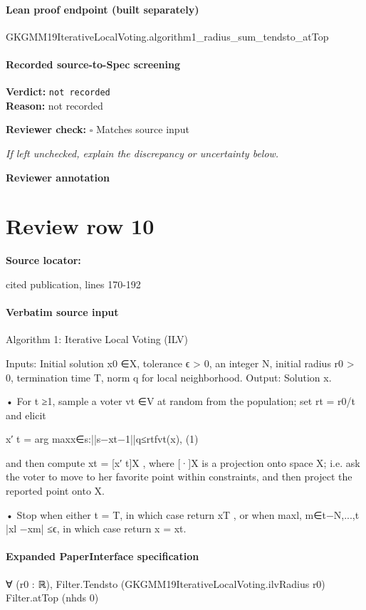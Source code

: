 \documentclass[10pt]{article}
\newcommand{\reviewerbox}{%
  \par\noindent\fbox{\parbox{0.96\linewidth}{\rule{0pt}{0.38in}}}\par
}
\newcommand{\reviewmatch}[1]{%
  \par\noindent\textbf{Reviewer check:} $\square$\; #1\par
  \noindent\emph{If left unchecked, explain the discrepancy or uncertainty below.}\par
}
\begin{document}
\paragraph{Lean proof endpoint (built separately)}\begin{ReviewVerbatim}
GKGMM19IterativeLocalVoting.algorithm1_radius_sum_tendsto_atTop
\end{ReviewVerbatim}

\paragraph{Recorded source-to-Spec screening}
\textbf{Verdict:} \texttt{not recorded}
\\
\textbf{Reason:} not recorded
\reviewmatch{Matches source input}
\noindent\textbf{Reviewer annotation}\par
\reviewerbox
\clearpage
\hypertarget{source-claim-ed1c239a4d71f093}{}
\section*{Review row 10}
\textbf{Source locator:} {\footnotesize\raggedright cited publication, lines 170-\allowbreak{}192\par}
\paragraph{Verbatim source input}
\begin{ReviewVerbatim}
Algorithm 1: Iterative Local Voting (ILV)

Inputs:
Initial solution x0 ∈X, tolerance ϵ > 0, an integer N, initial radius r0 > 0,
termination time T, norm q for local neighborhood.
Output:
Solution x.

• For t ≥1, sample a voter vt ∈V at random from the population; set rt = r0/t
and elicit

x′
t = arg maxx∈{s:||s−xt−1||q≤rt}fvt(x),
(1)

and then compute xt = [x′
t]X , where [·]X is a projection onto space X; i.e. ask
the voter to move to her favorite point within constraints, and then project the
reported point onto X.

• Stop when either t = T, in which case return xT , or when
maxl, m∈{t−N,...,t} |xl −xm| ≤ϵ, in which case return x = xt.
\end{ReviewVerbatim}


\paragraph{Expanded PaperInterface specification}
\begin{ReviewVerbatim}
∀ (r0 : ℝ), Filter.Tendsto (GKGMM19IterativeLocalVoting.ilvRadius r0) Filter.atTop (nhds 0)
\end{ReviewVerbatim}
\end{document}
